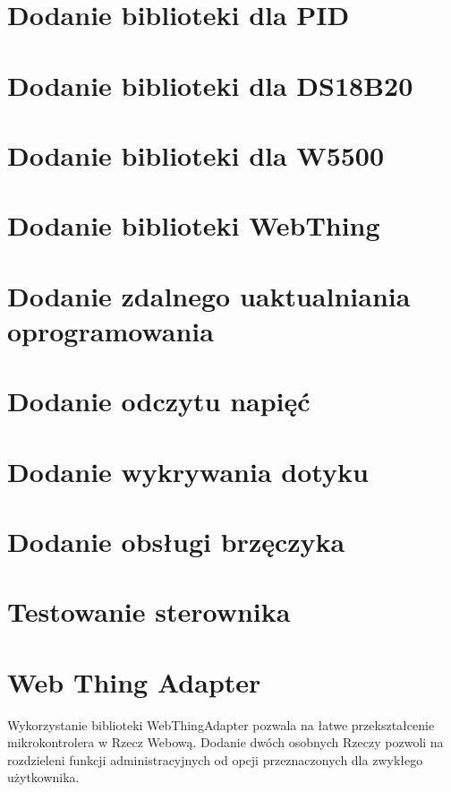 \documentclass[11pt]{report}
\begin{document}
 \section{Dodanie biblioteki dla PID}

 \section{Dodanie biblioteki dla DS18B20}

 \section{Dodanie biblioteki dla W5500}

 \section{Dodanie biblioteki WebThing}

 
 \section{Dodanie zdalnego uaktualniania oprogramowania}

 
 \section{Dodanie odczytu napięć}

 
 \section{Dodanie wykrywania dotyku}

 
 \section{Dodanie obsługi brzęczyka}

 
 \section{Testowanie sterownika}
 
 
 \section{Web Thing Adapter}
 Wykorzystanie biblioteki WebThingAdapter pozwala na łatwe przekształcenie mikrokontrolera w Rzecz Webową.
 Dodanie dwóch osobnych Rzeczy pozwoli na rozdzieleni funkcji administracyjnych od opcji przeznaczonych dla zwykłego użytkownika.
 
\end{document}
